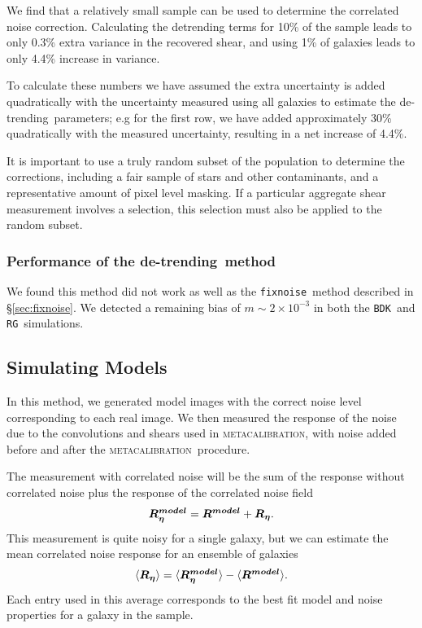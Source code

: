 \documentclass[iop]{emulateapj}
\newcommand{\mcal}{\textsc{metacalibration}}
\newcommand{\mcalRnoise}{\mbox{\boldmath $R_\eta$}}
\newcommand{\mcalRmodel}{\mbox{\boldmath $R^{model}$}}
\newcommand{\mcalRnoisemodel}{\mbox{\boldmath $R^{model}_\eta$}}
\newcommand{\detrend}{de-trending}
\newcommand{\fixnoise}{\texttt{fixnoise}}
\newcommand{\bdksim}{\texttt{BDK}}
\newcommand{\rgsim}{\texttt{RG}}
\begin{document}
We find that a relatively small sample can be used to determine the correlated
noise correction.  Calculating the detrending terms for 10\% of the sample
leads to only 0.3\% extra variance in the recovered shear, and using 1\% of
galaxies leads to only 4.4\% increase in variance.

To calculate these numbers we have assumed the extra uncertainty is added
quadratically with the uncertainty measured using all galaxies to estimate the
\detrend\ parameters; e.g for the first row, we have added approximately 30\%
quadratically with the measured uncertainty, resulting in a net increase of
4.4\%.

It is important to use a truly random subset of the population to determine the
corrections, including a fair sample of stars and other contaminants, and a
representative amount of pixel level masking.  If a particular aggregate shear
measurement involves a selection, this selection must also be applied to the
random subset.

\subsubsection{Performance of the \detrend\ method}

We found this method did not work as well as the \fixnoise\ method
described in \S \ref{sec:fixnoise}.  We detected a remaining bias
of $m \sim 2 \times 10^{-3}$ in both the \bdksim\ and \rgsim\ simulations.

\subsection{Simulating Models}

In this method, we generated model images with the correct noise level corresponding
to each real image.  We then measured the response of the noise due to the
convolutions and shears used in \mcal, with noise added before and
after the \mcal\ procedure.

The measurement with correlated noise will be the sum of the response
without correlated noise plus the response of the correlated noise field
\begin{equation}
    \mcalRnoisemodel = \mcalRmodel + \mcalRnoise.
\end{equation}
This measurement is quite noisy for a single galaxy, but we
can estimate the mean correlated noise response for an ensemble
of galaxies
\begin{equation}
    \langle \mcalRnoise \rangle = \langle \mcalRnoisemodel \rangle - \langle \mcalRmodel \rangle.
\end{equation}
Each entry used in this average corresponds to the best fit model
and noise properties for a galaxy in the sample.
\end{document}
